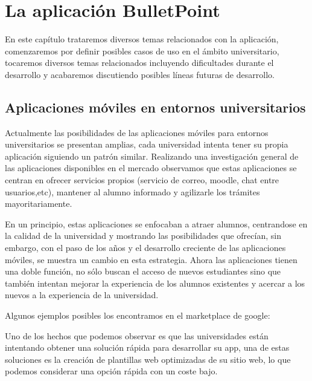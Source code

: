 %
%
%

\chapter{La aplicación BulletPoint} \label{chap:LaAplicacion} 

En este capítulo trataremos diversos temas relacionados con la aplicación, comenzaremos por definir posibles casos de uso en el ámbito universitario, tocaremos diversos temas relacionados incluyendo dificultades durante el desarrollo y acabaremos discutiendo posibles líneas futuras de desarrollo.

 
\section{Aplicaciones móviles en entornos universitarios}


Actualmente las posibilidades de las aplicaciones móviles para entornos universitarios se presentan amplias, cada universidad intenta tener su propia aplicación siguiendo un patrón similar. Realizando una investigación general de las aplicaciones disponibles en el mercado observamos que estas aplicaciones se centran en ofrecer servicios propios (servicio de correo, moodle, chat entre usuarios,etc), mantener al alumno informado y agilizarle los trámites mayoritariamente. 

En un principio, estas aplicaciones se enfocaban a atraer alumnos, centrandose en la calidad de la universidad y mostrando las posibilidades que ofrecían, sin embargo, con el paso de los años y el desarrollo creciente de las aplicaciones móviles, se muestra un cambio en esta estrategia. Ahora las aplicaciones tienen una doble función, no sólo buscan el acceso de nuevos estudiantes sino que también intentan mejorar la experiencia de los alumnos existentes y acercar a los nuevos a la experiencia de la universidad. 

Algunos ejemplos posibles los encontramos en el marketplace de google:


Uno de los hechos que podemos observar es que las universidades están intentando obtener una solución rápida para desarrollar su app, una de estas soluciones es la creación de plantillas web optimizadas de su sitio web, lo que podemos considerar una opción rápida con un coste bajo.

